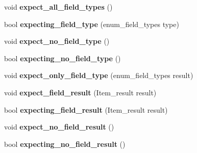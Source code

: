 \begin{DoxyCompactItemize}
\mbox{\label{classNdb__cond__traverse__context_a557659d82e2cc384f3423027bafbfc49}} 
void {\bfseries expect\+\_\+all\+\_\+field\+\_\+types} ()
\item 
\mbox{\label{classNdb__cond__traverse__context_a0e9133d74d779df14ec381f543cb9721}} 
bool {\bfseries expecting\+\_\+field\+\_\+type} (enum\+\_\+field\+\_\+types type)
\item 
\mbox{\label{classNdb__cond__traverse__context_a0004353d747995c87c0b33f51201c425}} 
void {\bfseries expect\+\_\+no\+\_\+field\+\_\+type} ()
\item 
\mbox{\label{classNdb__cond__traverse__context_a7537eea50243d40713599b2abc88dcba}} 
bool {\bfseries expecting\+\_\+no\+\_\+field\+\_\+type} ()
\item 
\mbox{\label{classNdb__cond__traverse__context_a3e0004a5231ee4ae05fbe17e2a509d96}} 
void {\bfseries expect\+\_\+only\+\_\+field\+\_\+type} (enum\+\_\+field\+\_\+types result)
\item 
\mbox{\label{classNdb__cond__traverse__context_a2a08e46a7d3e85699b01294aae8fcb53}} 
void {\bfseries expect\+\_\+field\+\_\+result} (Item\+\_\+result result)
\item 
\mbox{\label{classNdb__cond__traverse__context_a6bbfb466fc0bb6743d48d35e1a9854e0}} 
bool {\bfseries expecting\+\_\+field\+\_\+result} (Item\+\_\+result result)
\item 
\mbox{\label{classNdb__cond__traverse__context_abdce724d5a546ba95031bdbdc11c7042}} 
void {\bfseries expect\+\_\+no\+\_\+field\+\_\+result} ()
\item 
\mbox{\label{classNdb__cond__traverse__context_abf981a113cb080ec4467dd9bb974cc22}} 
bool {\bfseries expecting\+\_\+no\+\_\+field\+\_\+result} ()
\item 
\mbox{\label{classNdb__cond__traverse__context_a644bc299cf7c6ad47d8bc33d40dda831}} 

\end{DoxyCompactItemize}
